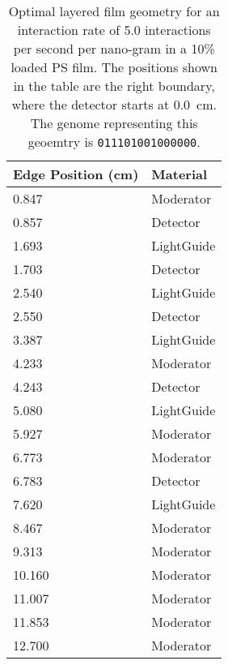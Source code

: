 \begin{table}
	\caption[Optimal Layered Film Geometry for 5.0 interaction per second per nanogram Cf-252]{Optimal layered film geometry for an interaction rate of 5.0 interactions per second per nano-gram   in a 10\%  loaded PS film. The positions shown in the table are the right boundary, where the detector starts at \SI{0.0}{\cm}. The genome representing this geoemtry is \texttt{011101001000000}.}
	\begin{tabular}{m{3cm} m{4cm}}
	\toprule
	Edge Position (\si{\cm}) & Material \\
	\midrule
0.847&Moderator\\
0.857&Detector\\
1.693&LightGuide\\
1.703&Detector\\
2.540&LightGuide\\
2.550&Detector\\
3.387&LightGuide\\
4.233&Moderator\\
4.243&Detector\\
5.080&LightGuide\\
5.927&Moderator\\
6.773&Moderator\\
6.783&Detector\\
7.620&LightGuide\\
8.467&Moderator\\
9.313&Moderator\\
10.160&Moderator\\
11.007&Moderator\\
11.853&Moderator\\
12.700&Moderator\\
	\bottomrule
	\end{tabular}
\end{table}
